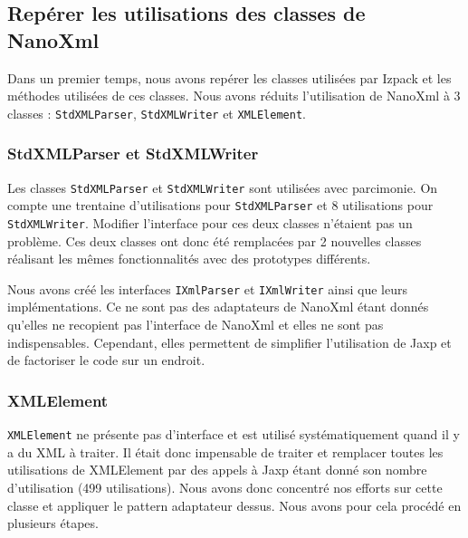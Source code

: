 \subsection{Repérer les utilisations des classes de NanoXml}
Dans un premier temps, nous avons repérer les classes utilisées par Izpack et les méthodes utilisées de ces classes.
Nous avons réduits l'utilisation de NanoXml à 3 classes : \verb|StdXMLParser|, \verb|StdXMLWriter| et \verb|XMLElement|.
\subsubsection{StdXMLParser et StdXMLWriter}
Les classes \verb|StdXMLParser| et \verb|StdXMLWriter| sont utilisées avec parcimonie.
On compte une trentaine d'utilisations pour \verb|StdXMLParser| et 8 utilisations pour \verb|StdXMLWriter|.
Modifier l'interface pour ces deux classes n'étaient pas un problème.
Ces deux classes ont donc été remplacées par 2 nouvelles classes réalisant les mêmes fonctionnalités avec des prototypes différents.

Nous avons créé les interfaces \verb|IXmlParser| et \verb|IXmlWriter| ainsi que leurs implémentations.
Ce ne sont pas des adaptateurs de NanoXml étant donnés qu'elles ne recopient pas l'interface de NanoXml et elles ne sont pas indispensables.
Cependant, elles permettent de simplifier l'utilisation de Jaxp et de factoriser le code sur un endroit.
\subsubsection{XMLElement}
\verb|XMLElement| ne présente pas d'interface et est utilisé systématiquement quand il y a du XML à traiter.
Il était donc impensable de traiter et remplacer toutes les utilisations de XMLElement par des appels à Jaxp étant donné son nombre d'utilisation (499 utilisations).
Nous avons donc concentré nos efforts sur cette classe et appliquer le pattern adaptateur dessus.
Nous avons pour cela procédé en plusieurs étapes.


